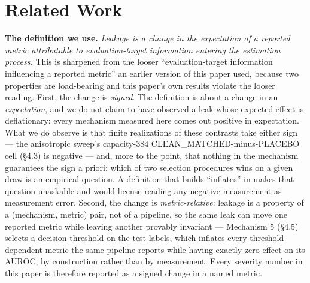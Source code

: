 \documentclass[10pt]{article} %
\begin{document}
\section{Related Work}

\textbf{The definition we use.} \emph{Leakage is a change in the expectation
of a reported metric attributable to evaluation-target information entering
the estimation process.} This is sharpened from the looser
``evaluation-target information influencing a reported metric'' an earlier
version of this paper used, because two properties are load-bearing and this
paper's own results violate the looser reading. First, the change is
\emph{signed}. The definition is about a change in an \emph{expectation}, and
we do not claim to have observed a leak whose expected effect is deflationary:
every mechanism measured here comes out positive in expectation. What we do
observe is that finite realizations of these contrasts take either sign --- the
anisotropic sweep's capacity-384 CLEAN\_MATCHED-minus-PLACEBO cell (§4.3) is
negative --- and, more to the point, that nothing in the mechanism guarantees
the sign a priori: which of two selection procedures wins on a given draw is an
empirical question. A definition that builds ``inflates'' in makes that
question unaskable and would license reading any negative measurement as
measurement error. Second, the change is
\emph{metric-relative}: leakage is a property of a (mechanism, metric) pair,
not of a pipeline, so the same leak can move one reported metric while
leaving another provably invariant --- Mechanism 5 (§4.5) selects a decision
threshold on the test labels, which inflates every threshold-dependent metric
the same pipeline reports while having exactly zero effect on its AUROC, by
construction rather than by measurement. Every severity number in this paper
is therefore reported as a signed change in a named metric.
\end{document}
